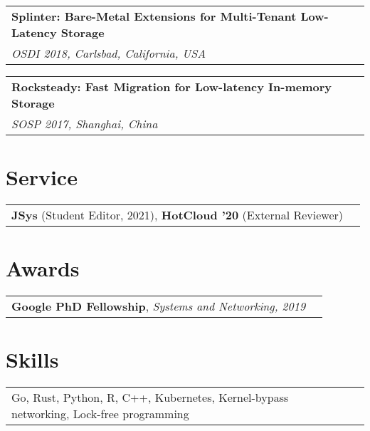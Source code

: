 \documentclass[margin,line]{res}
\begin{document}
\begin{resume}
\vspace{-7pt}
\begin{tabular}{@{}p{5.5in}p{4in}}
{\bf Splinter: Bare-Metal Extensions for Multi-Tenant Low-Latency Storage}\\
{\small\em OSDI 2018, Carlsbad, California, USA}\\
\end{tabular}

\vspace{-7pt}
\begin{tabular}{@{}p{5.5in}p{4in}}
{\bf Rocksteady: Fast Migration for Low-latency In-memory Storage}\\
{\small\em SOSP 2017, Shanghai, China}\\
\end{tabular}

\section{\sc Service}
\begin{tabular}{@{}p{5.5in}p{4in}}
{\bf JSys} {\small (Student Editor, 2021)}, {\bf HotCloud '20} {\small
(External Reviewer)}\\
\end{tabular}

\section{\sc Awards}
\begin{tabular}{@{}p{5.5in}p{4in}}
{\bf Google PhD Fellowship}, {\small\em Systems and Networking, 2019}\\
\end{tabular}

\section{\sc Skills}
\begin{tabular}{@{}p{5.5in}p{4in}}
Go, Rust, Python, R, C++, Kubernetes, Kernel-bypass networking, Lock-free programming
\end{tabular}

\end{resume}
\end{document}
